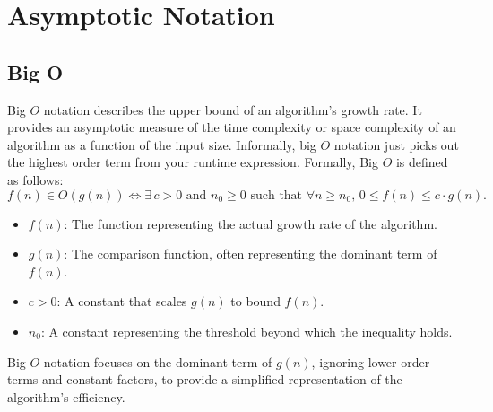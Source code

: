 \section{Asymptotic Notation}

\subsection{Big O}
Big \( O \) notation describes the upper bound 
of an algorithm's growth rate. It provides an 
asymptotic measure of the time complexity or 
space complexity of an algorithm as a function of 
the input size. Informally, big \( O \) notation
just picks out the highest 
order term from your runtime expression. 
Formally, Big \( O \) is defined as follows:
\[
f(n) \in O(g(n)) \iff \exists \, c > 0 \text{ and } n_0 \geq 0 \text{ such that } \forall n \geq n_0, \, 0 \leq f(n) \leq c \cdot g(n).
\]
\begin{itemize}
    \item \( f(n) \): The function representing the actual growth rate of the algorithm.
    \item \( g(n) \): The comparison function, often representing the dominant term of \( f(n) \).
    \item \( c > 0 \): A constant that scales \( g(n) \) to bound \( f(n) \).
    \item \( n_0 \): A constant representing the threshold beyond which the inequality holds.
\end{itemize}

Big \( O \) notation focuses on the dominant term of \( g(n) \), 
ignoring lower-order terms and constant factors, to provide a 
simplified representation of the algorithm's efficiency.

